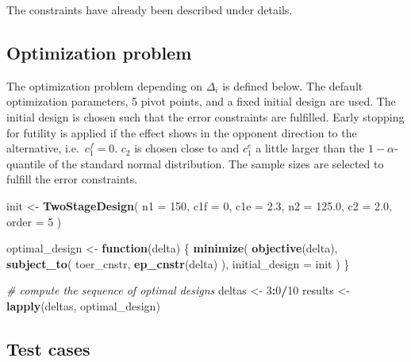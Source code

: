 \documentclass[
]{book}
\newenvironment{Shaded}{\begin{snugshade}}{\end{snugshade}}
\newcommand{\CommentTok}[1]{\textcolor[rgb]{0.56,0.35,0.01}{\textit{#1}}}
\newcommand{\ControlFlowTok}[1]{\textcolor[rgb]{0.13,0.29,0.53}{\textbf{#1}}}
\newcommand{\DataTypeTok}[1]{\textcolor[rgb]{0.13,0.29,0.53}{#1}}
\newcommand{\DecValTok}[1]{\textcolor[rgb]{0.00,0.00,0.81}{#1}}
\newcommand{\FloatTok}[1]{\textcolor[rgb]{0.00,0.00,0.81}{#1}}
\newcommand{\KeywordTok}[1]{\textcolor[rgb]{0.13,0.29,0.53}{\textbf{#1}}}
\newcommand{\NormalTok}[1]{#1}
\newcommand{\OperatorTok}[1]{\textcolor[rgb]{0.81,0.36,0.00}{\textbf{#1}}}
\newcommand{\StringTok}[1]{\textcolor[rgb]{0.31,0.60,0.02}{#1}}
\begin{document}
The constraints have already been described under details.

\hypertarget{optimization-problem}{%
\subsection{Optimization problem}\label{optimization-problem}}

The optimization problem depending on \(\Delta_i\) is defined below.
The default optimization parameters, 5 pivot points, and a fixed initial design
are used.
The initial design is chosen such that the error constraints are
fulfilled. Early stopping for futility is applied if the effect shows
in the opponent direction to the alternative, i.e.~\(c_1^f=0\).
\(c_2\) is chosen close to and \(c_1^e\) a little larger than the \(1-\alpha\)-quantile
of the standard normal distribution. The sample sizes are selected
to fulfill the error constraints.

\begin{Shaded}
\begin{Highlighting}[]
\NormalTok{init <-}\StringTok{ }\KeywordTok{TwoStageDesign}\NormalTok{(}
    \DataTypeTok{n1    =} \DecValTok{150}\NormalTok{,}
    \DataTypeTok{c1f   =} \DecValTok{0}\NormalTok{,}
    \DataTypeTok{c1e   =} \FloatTok{2.3}\NormalTok{,}
    \DataTypeTok{n2    =} \FloatTok{125.0}\NormalTok{,}
    \DataTypeTok{c2    =} \FloatTok{2.0}\NormalTok{,}
    \DataTypeTok{order =} \DecValTok{5}
\NormalTok{)}

\NormalTok{optimal_design <-}\StringTok{ }\ControlFlowTok{function}\NormalTok{(delta) \{}
    \KeywordTok{minimize}\NormalTok{(}
        \KeywordTok{objective}\NormalTok{(delta),}
        \KeywordTok{subject_to}\NormalTok{(}
\NormalTok{            toer_cnstr,}
            \KeywordTok{ep_cnstr}\NormalTok{(delta)}
\NormalTok{        ),}
        \DataTypeTok{initial_design =}\NormalTok{ init}
\NormalTok{    )}
\NormalTok{\}}

\CommentTok{# compute the sequence of optimal designs}
\NormalTok{deltas  <-}\StringTok{ }\DecValTok{3}\OperatorTok{:}\DecValTok{0}\OperatorTok{/}\DecValTok{10}
\NormalTok{results <-}\StringTok{ }\KeywordTok{lapply}\NormalTok{(deltas, optimal_design)}
\end{Highlighting}
\end{Shaded}

\hypertarget{test-cases-6}{%
\subsection{Test cases}\label{test-cases-6}}
\end{document}
